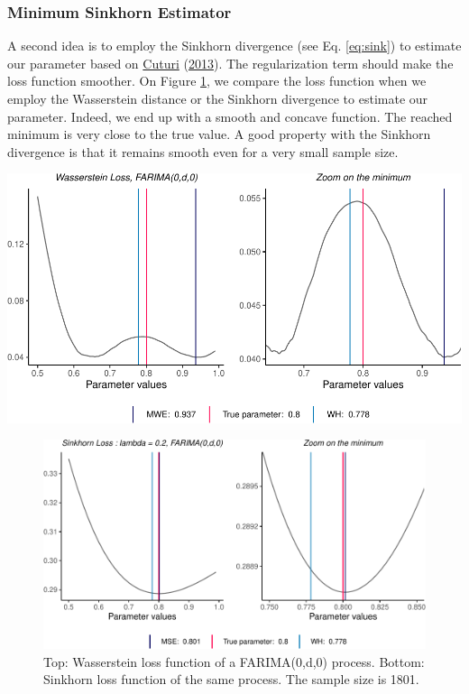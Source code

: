 \documentclass[
  11pt,
]{article}
\begin{document}
\hypertarget{minimum-sinkhorn-estimator}{%
\subsubsection{Minimum Sinkhorn
Estimator}\label{minimum-sinkhorn-estimator}}

A second idea is to employ the Sinkhorn divergence (see Eq.
\ref{eq:sink}) to estimate our parameter based on
\protect\hyperlink{ref-cuturi2013sinkhorn}{Cuturi}
(\protect\hyperlink{ref-cuturi2013sinkhorn}{2013}). The regularization
term should make the loss function smoother. On Figure
\ref{fig:sinkhorn}, we compare the loss function when we employ the
Wasserstein distance or the Sinkhorn divergence to estimate our
parameter. Indeed, we end up with a smooth and concave function. The
reached minimum is very close to the true value. A good property with
the Sinkhorn divergence is that it remains smooth even for a very small
sample size.

\hfill\break
\hfill\break

\begin{center}\includegraphics[width=0.65\linewidth]{Master_thesis_V1_files/figure-latex/wasserstein_SH-1} \end{center}

\begin{figure}

{\centering \includegraphics[width=0.65\linewidth]{Master_thesis_V1_files/figure-latex/sinkhorn-1} 

}

\caption{Top: Wasserstein loss function of a FARIMA(0,d,0) process. Bottom: Sinkhorn loss function of the same process. The sample size is 1801.}\label{fig:sinkhorn}
\end{figure}
\end{document}
